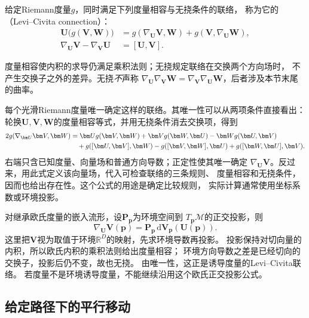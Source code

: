 \begin{definition}
\label{def:geometry-levi-civita-connection}
给定Riemann度量$g$，同时满足下列度量相容与无挠条件的联络，
称为它的（Levi--Civita connection）：
\begin{align*}
 \bm U\bigl(g(\bm V,\bm W)\bigr)
 &=g(\nabla_{\bm U}\bm V,\bm W)+g(\bm V,\nabla_{\bm U}\bm W),\\
 \nabla_{\bm U}\bm V-\nabla_{\bm V}\bm U&=[\bm U,\bm V].
\end{align*}
\end{definition}
度量相容使内积的求导仍满足乘积法则；无挠规定联络在交换两个方向场时，
不产生交换子之外的差异。无挠\emph{不}声称
$\nabla_{\bm U}\nabla_{\bm V}\bm W
=\nabla_{\bm V}\nabla_{\bm U}\bm W$，后者涉及本节末尾的曲率。

每个光滑Riemann度量唯一确定这样的联络。其唯一性可以从两项条件直接看出：
轮换$\bm U,\bm V,\bm W$的度量相容等式，并用无挠条件消去交换项，得到
\begin{align}
 2g(\nabla_{\bm U}\bm V,\bm W)
 &=\bm U g(\bm V,\bm W)+\bm V g(\bm W,\bm U)
   -\bm W g(\bm U,\bm V)\notag\\
 &\quad+g([\bm U,\bm V],\bm W)-g([\bm V,\bm W],\bm U)
   +g([\bm W,\bm U],\bm V).
 \label{eq:geometry-koszul-formula}
\end{align}
右端只含已知度量、向量场和普通方向导数；正定性使其唯一确定
$\nabla_{\bm U}\bm V$。反过来，用此式定义该向量场，代入可检查联络的三条规则、
度量相容和无挠条件，因而也给出存在性。这个公式的用途是确定比较规则，
实际计算通常使用坐标系数或环境投影。

对继承欧氏度量的嵌入流形，设$\bm P_{\bm p}$为环境空间到
$T_{\bm p}\mathcal M$的正交投影，则
\begin{equation}
 \nabla_{\bm U}\bm V(\bm p)
 =\bm P_{\bm p}\,\mathrm d\bm V_{\bm p}(\bm U(\bm p)).
 \label{eq:geometry-projected-connection}
\end{equation}
这里把$\bm V$视为取值于环境$\mathbb R^D$的映射，先求环境导数再投影。
投影保持对切向量的内积，所以欧氏内积的乘积法则给出度量相容；
环境方向导数之差是已经切向的交换子，投影后仍不变，故也无挠。
由唯一性，这正是诱导度量的Levi--Civita联络。
若度量不是环境诱导度量，不能继续沿用这个欧氏正交投影公式。

\subsection{给定路径下的平行移动}
\label{sec:geometry-parallel-transport}

